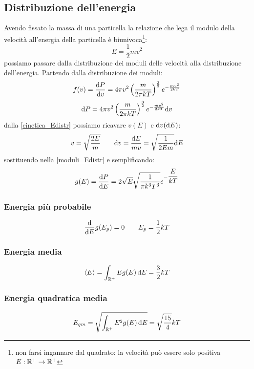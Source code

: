 \subsection{Distribuzione dell'energia}
Avendo fissato la massa di una particella la relazione che lega il modulo della velocità all'energia della particella è biunivoca\footnote{non farsi ingannare dal quadrato: la velocità può essere solo positiva $E:\mathbb{R}^+\to\mathbb{R}^+$}:
\begin{equation}
	E=\frac{1}{2}mv^2
	\label{cinetica_Edistr}
\end{equation}
possiamo passare dalla distribuzione dei moduli delle velocità alla distribuzione dell'energia. Partendo dalla distribuzione dei moduli:
\begin{equation}
	f(v)=\frac{\mathrm{d} P}{\mathrm{d} v}=4\pi v^2\left(\frac{m}{2\pi kT}\right)^{\frac{3}{2}}e^{-\frac{mv^2}{2kT}}
\end{equation}
\begin{equation}
	{\mathrm{d}P}=4\pi v^2\left(\frac{m}{2\pi kT}\right)^{\frac{3}{2}}e^{-\frac{mv^2}{2kT}}{\mathrm{d} v}
	\label{moduli_Edistr}
\end{equation}
dalla \eqref{cinetica_Edistr} possiamo ricavare $v(E)$ e $\mathrm{d} v(\mathrm{d} E)$:
\begin{equation}
	v=\sqrt{\frac{2E}{m}}\qquad \mathrm{d} v=\frac{\mathrm{d} E}{mv}=\sqrt{\frac{1}{2Em}}\mathrm{d} E
\end{equation}
sostituendo nella \eqref{moduli_Edistr} e semplificando:
\begin{equation}
	g(E)=\frac{\mathrm{d} P}{\mathrm{d} E}=2\sqrt{E}\sqrt{\frac{1}{\pi k^3T^3}}e^{-\dfrac{E}{kT}}
\end{equation}
\subsubsection{Energia più probabile}
\begin{equation}
	\frac{\mathrm{d}}{\mathrm{d} E}g(E_p)=0\qquad
	E_p=\frac{1}{2}kT
\end{equation}
\subsubsection{Energia media}
\begin{equation}
	\left<E\right>=\int_{\mathbb{R}^+} Eg(E)\,\mathrm{d} E=\frac{3}{2}kT
\end{equation}
\subsubsection{Energia quadratica media}
\begin{equation}
	E_{qm}=\sqrt{\int_{\mathbb{R}^+} E^2 g(E)\,\mathrm{d} E}=\sqrt{\frac{15}{4}}kT
\end{equation}
